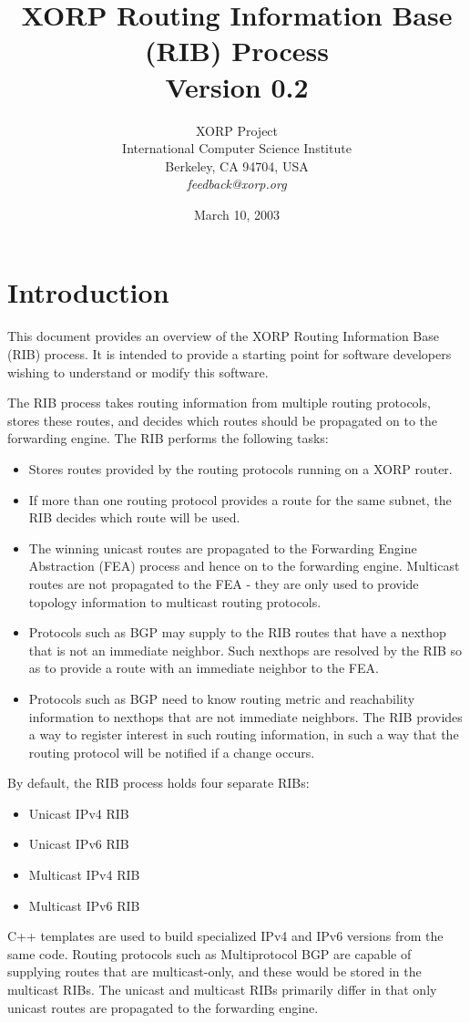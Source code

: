 \documentclass[11pt]{article}
\title{XORP Routing Information Base (RIB) Process \\
\vspace{1ex}
Version 0.2}
\author{ XORP Project					\\
	 International Computer Science Institute	\\
	 Berkeley, CA 94704, USA			\\
	 {\it feedback@xorp.org}
}
\date{March 10, 2003}
\begin{document}
\maketitle                            
\section{Introduction}
This document provides an overview of the XORP Routing Information
Base (RIB) process.  It is intended to provide a starting point for
software developers wishing to understand or modify this software.

The RIB process takes routing information from multiple routing
protocols, stores these routes, and decides which routes should be
propagated on to the forwarding engine.  The RIB performs the following
tasks:
\begin{itemize}
\item Stores routes provided by the routing protocols running on a
XORP router.
\item If more than one routing protocol provides a route for the same
subnet, the RIB decides which route will be used.
\item The winning unicast routes are propagated to the Forwarding
Engine Abstraction (FEA) process and hence on to the forwarding
engine.  Multicast routes are not propagated to the FEA - they are
only used to provide topology information to multicast routing
protocols.
\item Protocols such as BGP may supply to the RIB routes that have a
nexthop that is not an immediate neighbor.  Such nexthops are resolved
by the RIB so as to provide a route with an immediate neighbor to the
FEA.
\item Protocols such as BGP need to know routing metric and
reachability information to nexthops that are not immediate
neighbors.  The RIB provides a way to register interest in such
routing information, in such a way that the routing protocol will be
notified if a change occurs.
\end{itemize}
By default, the RIB process holds four separate RIBs:
\begin{itemize}
\item Unicast IPv4 RIB
\item Unicast IPv6 RIB
\item Multicast IPv4 RIB
\item Multicast IPv6 RIB
\end{itemize}
C++ templates are used to build specialized IPv4 and IPv6 versions
from the same code.  Routing protocols such as Multiprotocol BGP are
capable of supplying routes that are multicast-only, and these would
be stored in the multicast RIBs.  The unicast and multicast RIBs
primarily differ in that only unicast routes are propagated to the
forwarding engine.
\end{document}
